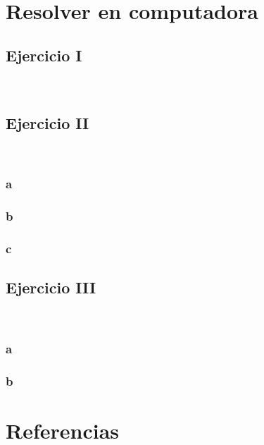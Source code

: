 \documentclass{article}
\begin{document}
\

\section*{Resolver en computadora}

\subsection*{Ejercicio I}

\

\subsection*{Ejercicio II}

\

\subsubsection*{a}

\subsubsection*{b}

\subsubsection*{c}

\subsection*{Ejercicio III}

\

\subsubsection*{a}

\subsubsection*{b}

\section*{Referencias}

\
\end{document}
